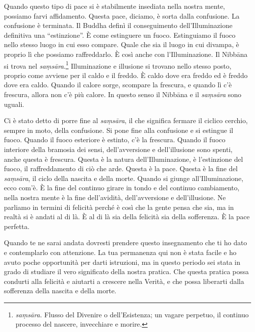 Quando questo tipo di pace si è stabilmente insediata nella nostra
mente, possiamo farvi affidamento. Questa pace, diciamo, è sorta dalla
confusione. La confusione è terminata. Il Buddha definì il conseguimento
dell'Illuminazione definitiva una ``estinzione''. È come estinguere un
fuoco. Estinguiamo il fuoco nello stesso luogo in cui esso compare.
Quale che sia il luogo in cui divampa, è proprio lì che possiamo
raffreddarlo. È così anche con l'Illuminazione. Il Nibbāna si
trova nel \emph{saṃsāra}.\footnote{\emph{saṃsāra.} Flusso del Divenire o
  dell'Esistenza; un vagare perpetuo, il continuo processo del nascere,
  invecchiare e morire.} Illuminazione e illusione si trovano nello
stesso posto, proprio come avviene per il caldo e il freddo. È caldo
dove era freddo ed è freddo dove era caldo. Quando il calore sorge,
scompare la frescura, e quando lì c'è frescura, allora non c'è più
calore. In questo senso il Nibbāna e il \emph{saṃsāra} sono
uguali.

Ci è stato detto di porre fine al \emph{saṃsāra}, il che significa
fermare il ciclico cerchio, sempre in moto, della confusione. Si pone
fine alla confusione e si estingue il fuoco. Quando il fuoco esteriore è
estinto, c'è la frescura. Quando il fuoco interiore della bramosia dei
sensi, dell'avversione e dell'illusione sono spenti, anche questa è
frescura. Questa è la natura dell'Illuminazione, è l'estinzione del
fuoco, il raffreddamento di ciò che arde. Questa è la pace. Questa è la
fine del \emph{saṃsāra}, il ciclo della nascita e della morte. Quando si
giunge all'Illuminazione, ecco com'è. È la fine del continuo girare in
tondo e del continuo cambiamento, nella nostra mente è la fine
dell'avidità, dell'avversione e dell'illusione. Ne parliamo in termini
di felicità perché è così che la gente pensa che sia, ma in realtà si è
andati al di là. È al di là sia della felicità sia della sofferenza. È
la pace perfetta.

Quando te ne sarai andata dovresti prendere questo insegnamento che ti
ho dato e contemplarlo con attenzione. La tua permanenza qui non è stata
facile e ho avuto poche opportunità per darti istruzioni, ma in questo
periodo sei stata in grado di studiare il vero significato della nostra
pratica. Che questa pratica possa condurti alla felicità e aiutarti a
crescere nella Verità, e che possa liberarti dalla sofferenza della
nascita e della morte.

